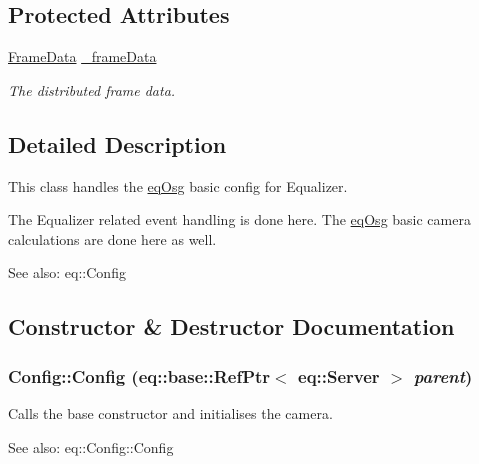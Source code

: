 \subsection*{Protected Attributes}
\begin{CompactItemize}
\item 
\hypertarget{a00003_26a7379aa8c578f1bd7d404256b70932}{
\hyperlink{a00010}{FrameData} \hyperlink{a00003_26a7379aa8c578f1bd7d404256b70932}{\_\-frameData}}
\label{a00003_26a7379aa8c578f1bd7d404256b70932}

\begin{CompactList}\small\item\em The distributed frame data. \item\end{CompactList}\end{CompactItemize}


\subsection{Detailed Description}
This class handles the \hyperlink{a00045}{eqOsg} basic config for Equalizer. 

The Equalizer related event handling is done here. The \hyperlink{a00045}{eqOsg} basic camera calculations are done here as well. \begin{Desc}
\item[See also:]eq::Config \end{Desc}


\subsection{Constructor \& Destructor Documentation}
\hypertarget{a00003_64865580c67831fd92e8c5222f0554cc}{
\subsubsection[{Config}]{\setlength{\rightskip}{0pt plus 5cm}Config::Config (eq::base::RefPtr$<$ eq::Server $>$ {\em parent})}}
\label{a00003_64865580c67831fd92e8c5222f0554cc}


Calls the base constructor and initialises the camera. 

\begin{Desc}
\item[See also:]eq::Config::Config \end{Desc}


